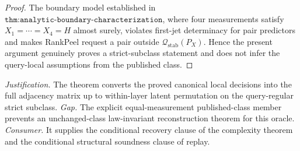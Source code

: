 \documentclass{article}
\begin{document}
\begin{proof}
The boundary model established in \(\texttt{thm:analytic-boundary-characterization}\), where four measurements satisfy \(X_1=\cdots=X_4=H\) almost surely, violates first-jet determinacy for pair predictors and makes RankPeel request a pair outside \(\mathcal Q_{\mathrm{stab}}(P_X)\).  Hence the present argument genuinely proves a strict-subclass statement and does not infer the query-local assumptions from the published class.
\end{proof}
\par\smallskip\noindent \textit{Justification.} The theorem converts the proved canonical local decisions into the full adjacency matrix up to within-layer latent permutation on the query-regular strict subclass. \textit{Gap.} The explicit equal-measurement published-class member prevents an unchanged-class law-invariant reconstruction theorem for this oracle. \textit{Consumer.} It supplies the conditional recovery clause of the complexity theorem and the conditional structural soundness clause of replay.
\end{document}
